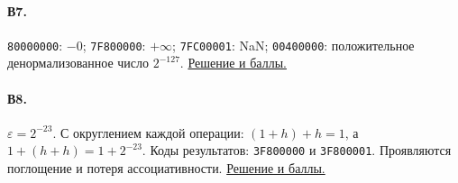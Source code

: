 \paragraph*{В7.}\label{ans:v7}
\texttt{80000000}: $-0$; \texttt{7F800000}: $+\infty$; \texttt{7FC00001}: NaN; \texttt{00400000}: положительное денормализованное число $2^{-127}$.
\hyperref[sol:v7]{Решение и баллы.}

\paragraph*{В8.}\label{ans:v8}
$\varepsilon=2^{-23}$. С округлением каждой операции: $(1+h)+h=1$, а $1+(h+h)=1+2^{-23}$. Коды результатов: \texttt{3F800000} и \texttt{3F800001}. Проявляются поглощение и потеря ассоциативности.
\hyperref[sol:v8]{Решение и баллы.}
